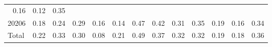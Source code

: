 \begin{table}[!h]
\begin{tabular}{lllllllllllll}
  \multicolumn{1}{r}{0.16} &
  \multicolumn{1}{r}{0.12} &
  \multicolumn{1}{r}{0.35} \\
\multicolumn{1}{l}{\hspace{1em}20206} &
  \multicolumn{1}{|r}{0.18} &
  \multicolumn{1}{r}{0.24} &
  \multicolumn{1}{r}{0.29} &
  \multicolumn{1}{r}{0.16} &
  \multicolumn{1}{r}{0.14} &
  \multicolumn{1}{r}{0.47} &
  \multicolumn{1}{r}{0.42} &
  \multicolumn{1}{r}{0.31} &
  \multicolumn{1}{r}{0.35} &
  \multicolumn{1}{r}{0.19} &
  \multicolumn{1}{r}{0.16} &
  \multicolumn{1}{r}{0.34} \\
\multicolumn{1}{l}{\hspace{1em}Total} &
  \multicolumn{1}{|r}{0.22} &
  \multicolumn{1}{r}{0.33} &
  \multicolumn{1}{r}{0.30} &
  \multicolumn{1}{r}{0.08} &
  \multicolumn{1}{r}{0.21} &
  \multicolumn{1}{r}{0.49} &
  \multicolumn{1}{r}{0.37} &
  \multicolumn{1}{r}{0.32} &
  \multicolumn{1}{r}{0.32} &
  \multicolumn{1}{r}{0.19} &
  \multicolumn{1}{r}{0.18} &
  \multicolumn{1}{r}{0.36} \\
\cline{1-13}
\end{tabular}
\end{table}

